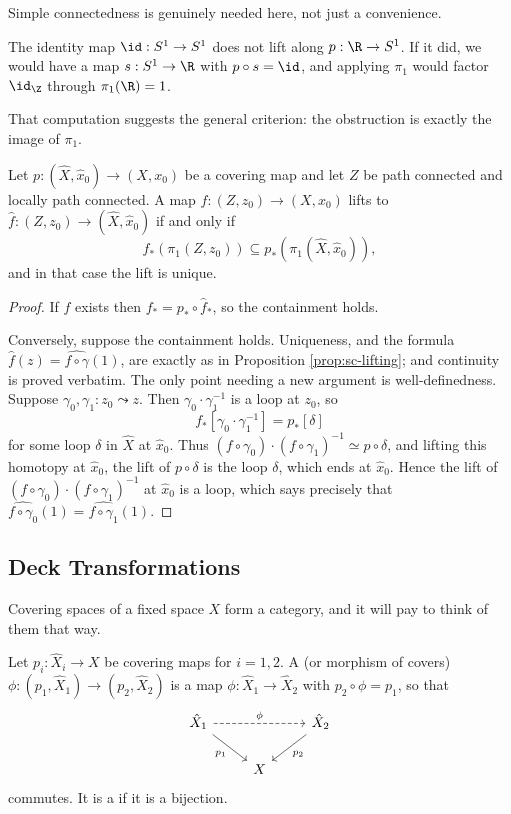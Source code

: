 Simple connectedness is genuinely needed here, not just a convenience.

\begin{example}
	The identity map $\id: S^1 \to S^1$ does not lift along $p: \R \to S^1$. If it did, we would have a map $s: S^1 \to \R$ with $p \circ s = \id$, and applying $\pi_1$ would factor $\id_\Z$ through $\pi_1(\R) = 1$.
\end{example}

That computation suggests the general criterion: the obstruction is exactly the image of
$\pi_1$.

\begin{theorem} \label{thm:lifting-criterion}
	Let $p: (\hat X, \hat x_0) \to (X, x_0)$ be a covering map and let $Z$ be path connected and locally path connected. A map $f: (Z, z_0) \to (X, x_0)$ lifts to $\hat f: (Z, z_0) \to (\hat X, \hat x_0)$ if and only if
	$$
	f_*(\pi_1(Z, z_0)) \subseteq p_*(\pi_1(\hat X, \hat x_0)),
	$$
	and in that case the lift is unique.
\end{theorem}
\begin{proof}
	If $\hat f$ exists then $f_* = p_* \circ \hat f_*$, so the containment holds.

	Conversely, suppose the containment holds. Uniqueness, and the formula $\hat f(z) = \widehat{f\circ\gamma}(1)$, are exactly as in Proposition \ref{prop:sc-lifting}; and continuity is proved verbatim. The only point needing a new argument is well-definedness. Suppose $\gamma_0, \gamma_1: z_0 \leadsto z$. Then $\gamma_0\cdot\gamma_1^{-1}$ is a loop at $z_0$, so
	$$
	f_*[\gamma_0\cdot\gamma_1^{-1}] = p_*[\delta]
	$$
	for some loop $\delta$ in $\hat X$ at $\hat x_0$. Thus $(f\circ\gamma_0)\cdot(f\circ\gamma_1)^{-1} \simeq p \circ \delta$, and lifting this homotopy at $\hat x_0$, the lift of $p \circ \delta$ is the loop $\delta$, which ends at $\hat x_0$. Hence the lift of $(f\circ\gamma_0)\cdot(f\circ\gamma_1)^{-1}$ at $\hat x_0$ is a loop, which says precisely that $\widehat{f\circ\gamma_0}(1) = \widehat{f\circ\gamma_1}(1)$.
\end{proof}

\subsection{Deck Transformations}

Covering spaces of a fixed space $X$ form a category, and it will pay to think of them
that way.

\begin{definition}
	Let $p_i: \hat X_i \to X$ be covering maps for $i = 1,2$. A  (or morphism of covers) $\phi: (p_1, \hat X_1) \to (p_2, \hat X_2)$ is a map $\phi: \hat X_1 \to \hat X_2$ with $p_2 \circ \phi = p_1$, so that
	\[\begin{tikzcd}
		{\hat X_1} \arrow[rr, "\phi", dashed] \arrow[rd, "{p_1}"'] & & {\hat X_2} \arrow[ld, "{p_2}"] \\
		& X &
	\end{tikzcd}\]
	commutes. It is a  if it is a bijection.
\end{definition}

